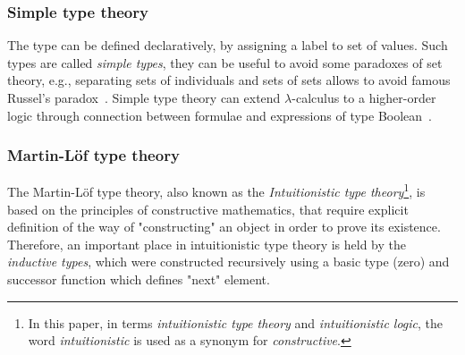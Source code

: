 \documentclass[article]{aaltoseries}
\begin{document}
\subsubsection{Simple type theory}
The type can be defined declaratively, by assigning a label to set of values. Such types are called \textit{simple types}, they can be useful to avoid some paradoxes of set theory, e.g., separating sets of individuals and sets of sets allows to avoid famous Russel's paradox~\cite{Irv95}. Simple type theory can extend $\lambda$-calculus to a higher-order logic through connection between formulae and expressions of type Boolean~\cite{Paulson90}.



\subsubsection{Martin-Löf type theory}
The Martin-Löf type theory, also known as the \textit{Intuitionistic type theory}\footnote{In this paper, in terms \textit{intuitionistic type theory} and \textit{intuitionistic logic}, the word \textit{intuitionistic} is used as a synonym for \textit{constructive}.}, is based on the principles of constructive mathematics, that require explicit definition of the way of "constructing" an object in order to prove its existence. Therefore, an important place in intuitionistic type theory is held by the \textit{inductive types}, which were constructed recursively using a basic type (zero) and successor function which defines "next" element.
\end{document}
